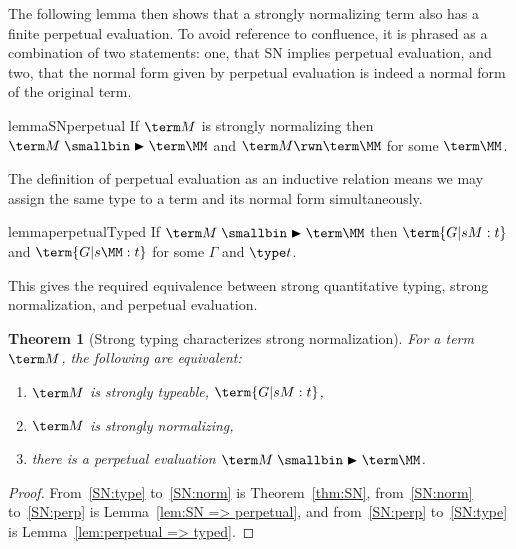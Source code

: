 \documentclass[10pt,a4paper]{amsart}
\newtheorem{theorem}{Theorem}
\newcommand\rp{\mathrel{\smallbin\blacktriangleright}}
\begin{document}
The following lemma then shows that a strongly normalizing term also has a finite perpetual evaluation. To avoid reference to confluence, it is phrased as a combination of two statements: one, that SN implies perpetual evaluation, and two, that the normal form given by perpetual evaluation is indeed a normal form of the original term.

\begin{restatable}{lemma}{SNperpetual}
\label{lem:SN => perpetual}
If $\term M$ is strongly normalizing then $\term M\rp\term\MM$ and $\term M\rwn\term\MM$ for some $\term\MM$.
\end{restatable}

The definition of perpetual evaluation as an inductive relation means we may assign the same type to a term and its normal form simultaneously.

\begin{restatable}{lemma}{perpetualTyped}
\label{lem:perpetual => typed}
If $\term M\rp\term\MM$ then $\term{G |s M:t}$ and $\term{G |s \MM:t}$ for some $\Gamma$ and $\type t$.
\end{restatable}

This gives the required equivalence between strong quantitative typing, strong normalization, and perpetual evaluation.


\begin{theorem}[Strong typing characterizes strong normalization]
\label{thm:strong}
For a term $\term M$, the following are equivalent:
\begin{enumerate}

\item\label{SN:type} $\term M$ is strongly typeable, $\term{G |s M:t}$,
\item\label{SN:norm} $\term M$ is strongly normalizing,
\item\label{SN:perp} there is a perpetual evaluation $\term M\rp\term\MM$.
\end{enumerate}
\end{theorem}

\begin{proof}
From~\ref{SN:type} to~\ref{SN:norm} is Theorem~\ref{thm:SN}, from~\ref{SN:norm} to~\ref{SN:perp} is Lemma~\ref{lem:SN => perpetual}, and from~\ref{SN:perp} to~\ref{SN:type} is Lemma~\ref{lem:perpetual => typed}.
\end{proof}
\end{document}
